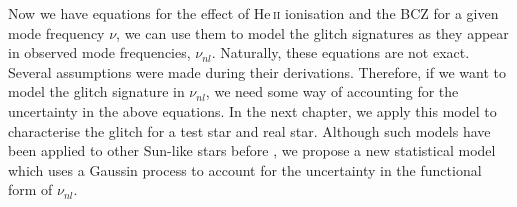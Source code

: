 Now we have equations for the effect of He\,\textsc{ii} ionisation and the BCZ for a given mode frequency \(\nu\), we can use them to model the glitch signatures as they appear in observed mode frequencies, \(\nu_{nl}\). Naturally, these equations are not exact. Several assumptions were made during their derivations. Therefore, if we want to model the glitch signature in \(\nu_{nl}\), we need some way of accounting for the uncertainty in the above equations. In the next chapter, we apply this model to characterise the glitch for a test star and real star. Although such models have been applied to other Sun-like stars before \citep[e.g.][]{Mazumdar.Monteiro.ea2014,Verma.Faria.ea2014}, we propose a new statistical model which uses a Gaussin process to account for the uncertainty in the functional form of \(\nu_{nl}\).
